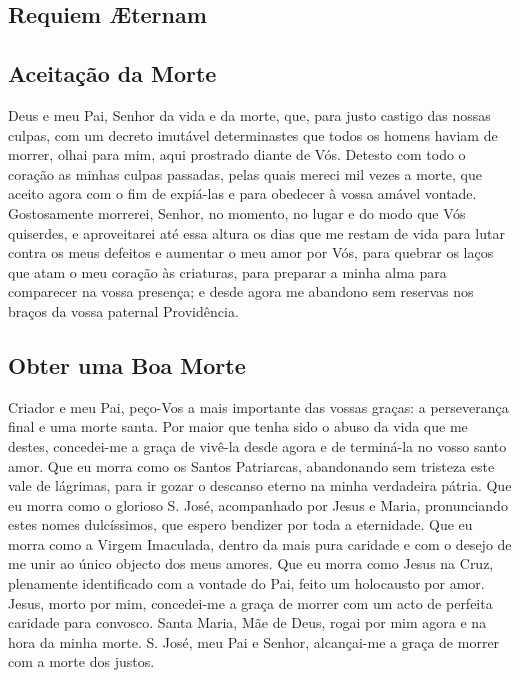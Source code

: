 \subsection{Requiem Æternam}\label{requiem}
\begin{paracol}{2}\switchcolumn{}\end{paracol}

\subsection{Aceitação da Morte}
 Deus e meu Pai, Senhor da vida e da morte, que, para justo castigo das nossas culpas, com um decreto imutável determinastes que todos os homens haviam de morrer, olhai para mim, aqui prostrado diante de Vós. Detesto com todo o coração as minhas culpas passadas, pelas quais mereci mil vezes a morte, que aceito agora com o fim de expiá-las e para obedecer à vossa amável vontade. Gostosamente morrerei, Senhor, no momento, no lugar e do modo que Vós quiserdes, e aproveitarei até essa altura os dias que me restam de vida para lutar contra os meus defeitos e aumentar o meu amor por Vós, para quebrar os laços que atam o meu coração às criaturas, para preparar a minha alma para comparecer na vossa presença; e desde agora me abandono sem reservas nos braços da vossa paternal Providência.

\subsection{Obter uma Boa Morte}
 Criador e meu Pai, peço-Vos a mais importante das vossas graças: a perseverança final e uma morte santa. Por maior que tenha sido o abuso da vida que me destes, concedei-me a graça de vivê-la desde agora e de terminá-la no vosso santo amor. Que eu morra como os Santos Patriarcas, abandonando sem tristeza este vale de lágrimas, para ir gozar o descanso eterno na minha verdadeira pátria. Que eu morra como o glorioso S. José, acompanhado por Jesus e Maria, pronunciando estes nomes dulcíssimos, que espero bendizer por toda a eternidade. Que eu morra como a Virgem Imaculada, dentro da mais pura caridade e com o desejo de me unir ao único objecto dos meus amores. Que eu morra como Jesus na Cruz, plenamente identificado com a vontade do Pai, feito um holocausto por amor. Jesus, morto por mim, concedei-me a graça de morrer com um acto de perfeita caridade para convosco. Santa Maria, Mãe de Deus, rogai por mim agora e na hora da minha morte. S. José, meu Pai e Senhor, alcançai-me a graça de morrer com a morte dos justos.

